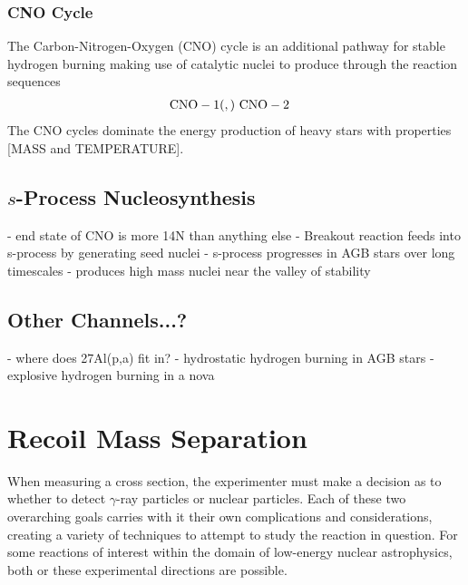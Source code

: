 \subsubsection{CNO Cycle}

The Carbon-Nitrogen-Oxygen (CNO) cycle is an additional pathway for stable
hydrogen burning making use of catalytic nuclei to produce  through
the reaction sequences
\begin{align*}
    \rm{CNO-1}& (,) \
    \rm{CNO-2}&
\end{align*}
The CNO cycles dominate the energy production of heavy stars with properties
[MASS and TEMPERATURE].

\subsection{$s$-Process Nucleosynthesis}

- end state of CNO is more 14N than anything else
- Breakout reaction feeds into s-process by generating seed nuclei
- s-process progresses in AGB stars over long timescales
- produces high mass nuclei near the valley of stability

\subsection{Other Channels...?}

- where does 27Al(p,a) fit in?
- hydrostatic hydrogen burning in AGB stars
- explosive hydrogen burning in a nova


\section{Recoil Mass Separation}

When measuring a cross section, the experimenter must make a decision as to
whether to detect $\gamma$-ray particles or nuclear particles. Each of these
two overarching goals carries with it their own complications and
considerations, creating a variety of techniques to attempt to study the
reaction in question. For some reactions of interest within the domain of
low-energy nuclear astrophysics, both or these experimental directions are
possible.

